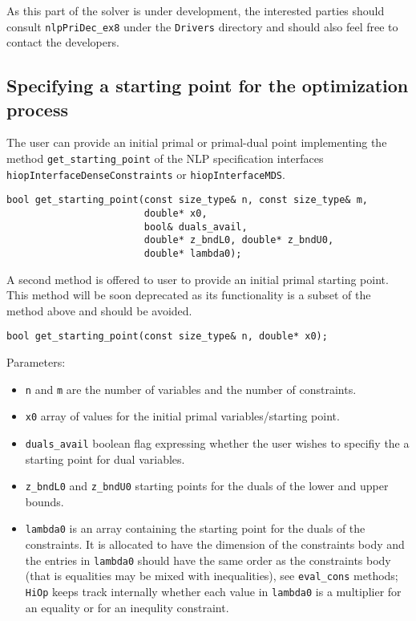 \documentclass[11pt]{article}
\newcommand{\Hi}{\texttt{HiOp}\xspace}
\begin{document}
\bigskip

As this part of the solver is under development, the interested parties should consult \texttt{nlpPriDec\_ex8} under the \texttt{Drivers} directory and should also feel free to contact the developers.

%
%

\subsection{Specifying a starting point for the optimization process}

The user  can  provide an initial primal or primal-dual point implementing the method \texttt{get\_starting\_point} of the NLP specification interfaces \texttt{hiopInterfaceDenseConstraints} or \texttt{hiopInterfaceMDS}. 

\begin{lstlisting} 
bool get_starting_point(const size_type& n, const size_type& m,
                        double* x0,
                        bool& duals_avail,
                        double* z_bndL0, double* z_bndU0,
                        double* lambda0);
\end{lstlisting} 

A second method is offered to user to provide an initial primal starting point. This method will be soon deprecated as its functionality is a subset of the method above and should be avoided.

\begin{lstlisting} 
bool get_starting_point(const size_type& n, double* x0);
\end{lstlisting} 

Parameters:
\begin{itemize}
\item \texttt{n} and \texttt{m} are the number of variables and the number of constraints.
\item \texttt{x0} array of values for the initial primal variables/starting point.
\item \texttt{duals\_avail} boolean flag expressing whether the user wishes to specifiy the a starting point for dual variables.
\item \texttt{z\_bndL0} and  \texttt{z\_bndU0} starting points for the duals of the lower and upper bounds.
\item \texttt{lambda0} is an array containing the starting point for the duals of the constraints. It is allocated to have the dimension of the constraints body and the entries in \texttt{lambda0} should have the same order as the constraints body (that is equalities may be mixed with inequalities), see \texttt{eval\_cons} methods; \Hi keeps track internally whether each value in \texttt{lambda0} is a multiplier for an equality or for an inequlity constraint.
\end{itemize}
  
\end{document}
